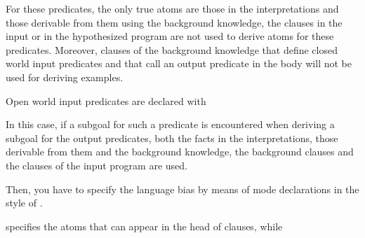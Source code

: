 \documentclass[letterpaper,10pt,english]{sphinxmanual}
\begin{document}
\sphinxAtStartPar
For these predicates, the only true atoms are those in the interpretations and those derivable from them using the background knowledge, the clauses in the input or in the hypothesized program are not used to derive atoms for these predicates. Moreover, clauses of the background knowledge that define closed world input predicates and that call an output predicate in the body will not be used for deriving examples.

\sphinxAtStartPar
Open world input predicates are declared with

\begin{sphinxVerbatim}[commandchars=\\\{\}]
\end{sphinxVerbatim}

\sphinxAtStartPar
In this case, if a subgoal for such a predicate is encountered when deriving a subgoal for the output predicates, both the facts in the interpretations, those derivable from them and the background knowledge, the background clauses and the clauses of the input program are used.

\sphinxAtStartPar
Then, you have to specify the language bias by means of mode declarations in the style of .

\begin{sphinxVerbatim}[commandchars=\\\{\}]
\end{sphinxVerbatim}

\sphinxAtStartPar
specifies the atoms that can appear in the head of clauses, while

\begin{sphinxVerbatim}[commandchars=\\\{\}]
\end{sphinxVerbatim}
\end{document}
